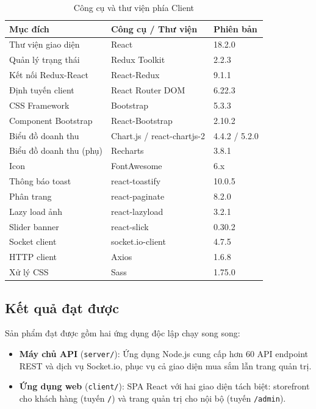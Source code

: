 \documentclass[../DoAn.tex]{subfiles}
\begin{document}
\begin{table}[H]
\centering
\caption{Công cụ và thư viện phía Client}
\label{tab:tools-client}
\scriptsize
\begin{tabular}{|p{4.5cm}|p{3.5cm}|p{5cm}|}
\hline
\textbf{Mục đích} & \textbf{Công cụ / Thư viện} & \textbf{Phiên bản} \\
\hline
Thư viện giao diện & React & 18.2.0 \\
\hline
Quản lý trạng thái & Redux Toolkit & 2.2.3 \\
\hline
Kết nối Redux-React & React-Redux & 9.1.1 \\
\hline
Định tuyến client & React Router DOM & 6.22.3 \\
\hline
CSS Framework & Bootstrap & 5.3.3 \\
\hline
Component Bootstrap & React-Bootstrap & 2.10.2 \\
\hline
Biểu đồ doanh thu & Chart.js / react-chartjs-2 & 4.4.2 / 5.2.0 \\
\hline
Biểu đồ doanh thu (phụ) & Recharts & 3.8.1 \\
\hline
Icon & FontAwesome & 6.x \\
\hline
Thông báo toast & react-toastify & 10.0.5 \\
\hline
Phân trang & react-paginate & 8.2.0 \\
\hline
Lazy load ảnh & react-lazyload & 3.2.1 \\
\hline
Slider banner & react-slick & 0.30.2 \\
\hline
Socket client & socket.io-client & 4.7.5 \\
\hline
HTTP client & Axios & 1.6.8 \\
\hline
Xử lý CSS & Sass & 1.75.0 \\
\hline
\end{tabular}
\end{table}

\subsection{Kết quả đạt được}
\label{subsection:4.3.2}

Sản phẩm đạt được gồm hai ứng dụng độc lập chạy song song:

\begin{itemize}
  \item \textbf{Máy chủ API} (\texttt{server/}): Ứng dụng Node.js cung cấp
        hơn 60 API endpoint REST và dịch vụ Socket.io, phục vụ cả giao diện
        mua sắm lẫn trang quản trị.
  \item \textbf{Ứng dụng web} (\texttt{client/}): SPA React với hai giao diện
        tách biệt: storefront cho khách hàng (tuyến \texttt{/}) và trang quản
        trị cho nội bộ (tuyến \texttt{/admin}).
\end{itemize}
\end{document}
